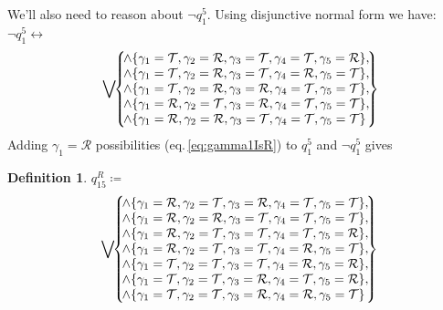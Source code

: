\documentclass[twoside,twocolumn,a4paper,11pt]{article}
\theoremstyle{definition}
\newtheorem{defn}[theorem]{Definition}
\begin{document}
We'll also need to reason about $\neg q_1^5$.
Using disjunctive normal form we have:
$\neg q_1^5 \leftrightarrow$
\begin{equation}
\label{eq:notq15}
\bigvee\!\!
 \left\lbrace\!
  \begin{matrix}
   \land\{\gamma_1=\mathcal{T},\gamma_2=\mathcal{R},\gamma_3=\mathcal{T},\gamma_4=\mathcal{T},
   \gamma_5=\mathcal{R}\},\\
   \land\{\gamma_1=\mathcal{T},\gamma_2=\mathcal{R},\gamma_3=\mathcal{T},\gamma_4=\mathcal{R},
   \gamma_5=\mathcal{T}\},\vspace{0pt}\\
   \land\{\gamma_1=\mathcal{T},\gamma_2=\mathcal{R},\gamma_3=\mathcal{R},\gamma_4=\mathcal{T},
   \gamma_5=\mathcal{T}\},\\
   \land\{\gamma_1=\mathcal{R},\gamma_2=\mathcal{T},\gamma_3=\mathcal{R},\gamma_4=\mathcal{T},
   \gamma_5=\mathcal{T}\},\\
   \land\{\gamma_1=\mathcal{R},\gamma_2=\mathcal{R},\gamma_3=\mathcal{T},\gamma_4=\mathcal{T},
   \gamma_5=\mathcal{T}\}\;\\
  \end{matrix}\!
 \right\rbrace\!\!\!
\end{equation}
Adding $\gamma_1=\mathcal{R}$ possibilities (eq.\,\eqref{eq:gamma1IsR}) to $q_1^5$ and 
$\neg q_1^5$ gives
\begin{defn}%
\label{def:q15R}
$q_{15}^R \coloneqq$
\begin{equation}
\label{eq:q15R}
\bigvee\!\!
 \left\lbrace\!
  \begin{matrix}
   \land\{\gamma_1=\mathcal{R},\gamma_2=\mathcal{T},\gamma_3=\mathcal{R},\gamma_4=\mathcal{T},
   \gamma_5=\mathcal{T}\},\\
   \land\{\gamma_1=\mathcal{R},\gamma_2=\mathcal{R},\gamma_3=\mathcal{T},\gamma_4=\mathcal{T},
   \gamma_5=\mathcal{T}\},\\
   \land\{\gamma_1=\mathcal{R},\gamma_2=\mathcal{T},\gamma_3=\mathcal{T},\gamma_4=\mathcal{T},
   \gamma_5=\mathcal{R}\},\\
   \land\{\gamma_1=\mathcal{R},\gamma_2=\mathcal{T},\gamma_3=\mathcal{T},\gamma_4=\mathcal{R},
   \gamma_5=\mathcal{T}\},\\
   \land\{\gamma_1=\mathcal{T},\gamma_2=\mathcal{T},\gamma_3=\mathcal{T},\gamma_4=\mathcal{R},
   \gamma_5=\mathcal{R}\},\vspace{0pt}\\
   \land\{\gamma_1=\mathcal{T},\gamma_2=\mathcal{T},\gamma_3=\mathcal{R},\gamma_4=\mathcal{T},
   \gamma_5=\mathcal{R}\},\\
   \land\{\gamma_1=\mathcal{T},\gamma_2=\mathcal{T},\gamma_3=\mathcal{R},\gamma_4=\mathcal{R},
   \gamma_5=\mathcal{T}\}\;\\
  \end{matrix}\!
 \right\rbrace\!\!
\end{equation}
\end{defn}
\end{document}
